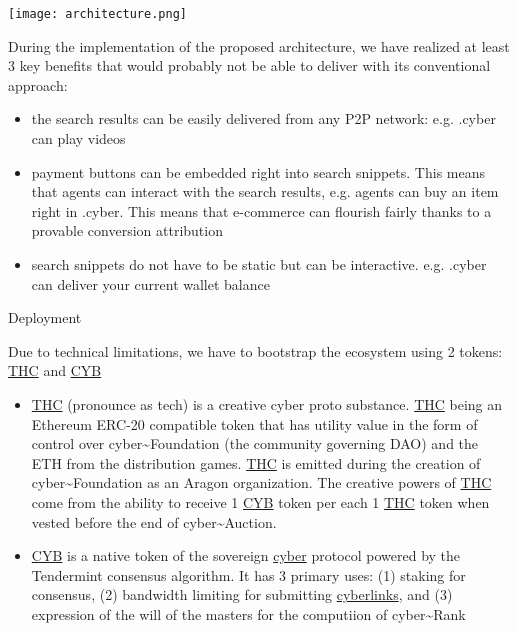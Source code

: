 \documentclass[8pt,oneside]{amsart}
\makeatletter
\newcommand{\linkred}[2]{\href{#1}{\color{red}{#2}}}
\renewcommand\subsection{\@startsection{subsection}
                                    {2}{\z@}
                                    {-3.25ex\@plus -1ex \@minus -.2ex}
                                    {0ex \@plus .2ex}
                                    {\play\Large}
                        }
\newcommand{\titleSection}[1]{\subsection{#1}}
\newenvironment{Figure}
  {\par\medskip\noindent\minipage{\linewidth}}
  {\endminipage\par\medskip}
\makeatother
\begin{document}
\begin{Figure}
    \centering
    \texttt{[image: architecture.png]}
\end{Figure}

During the implementation of the proposed architecture, we have realized at least 3 key benefits that \linkred{https://google.com}{Google} would probably not be able to deliver with its conventional approach:

\begin{itemize}
\item the search results can be easily delivered from any P2P network: e.g. .cyber can play videos
\item payment buttons can be embedded right into search snippets. This means that agents can interact with the search results, e.g. agents can buy an item right in .cyber. This means that e-commerce can flourish fairly thanks to a provable conversion attribution
\item search snippets do not have to be static but can be interactive. e.g. .cyber can deliver your current wallet balance
\end{itemize}

\titleSection{Deployment}\label{deployment}

Due to technical limitations, we have to bootstrap the ecosystem using 2 tokens: {\hyperref[thc]{THC}} and {\hyperref[cyb]{CYB}}

\begin{itemize}
\item {\hyperref[thc]{THC}} (pronounce as tech) is a creative cyber proto substance. {\hyperref[thc]{THC}} being an Ethereum ERC-20 compatible token that has utility value in the form of control over cyber\~{}Foundation (the community governing DAO) and the ETH from the distribution games. {\hyperref[thc]{THC}} is emitted during the creation of cyber\~{}Foundation as an Aragon organization. The creative powers of {\hyperref[thc]{THC}} come from the ability to receive 1 {\hyperref[cyb]{CYB}} token per each 1 {\hyperref[thc]{THC}} token when vested before the end of cyber\~{}Auction.
\item {\hyperref[cyb]{CYB}} is a native token of the sovereign {\hyperref[cyber]{cyber}} protocol powered by the Tendermint consensus algorithm. It has 3 primary uses: (1) staking for consensus, (2) bandwidth limiting for submitting {\hyperref[cyberlinks]{cyberlinks}}, and (3) expression of the will of the masters for the computiion of cyber\~{}Rank
\end{itemize}
\end{document}

